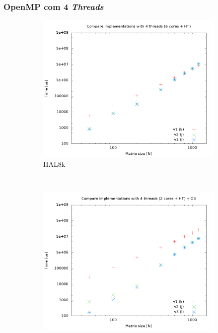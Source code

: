 \documentclass[a4paper, 12pt]{article}
\begin{document}
\subsubsection{OpenMP com 4 \textit{Threads}}
\begin{figure}[H]
    \centering
    \begin{subfigure}[H]{0.5\textwidth}
        \includegraphics[width=\textwidth]{HAL_cmp_versions-4t}
        \caption{HAL8k}
        \label{fig:8k_cmp_2t}
    \end{subfigure}%
    ~ %
    \begin{subfigure}[H]{0.5\textwidth}
        \includegraphics[width=\textwidth]{hpops2_O3_cmp_versions-4t}

\end{subfigure}
\end{figure}
\end{document}
